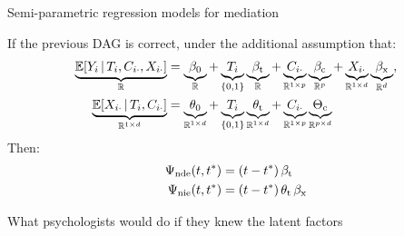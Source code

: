 \documentclass[aspectratio=169]{beamer}
\theoremstyle{remark}
\begin{document}
\begin{frame}{Semi-parametric regression models for mediation}

    If the previous DAG is correct, under the additional assumption that:
    \begin{equation*}
        \begin{aligned}
            \underbrace{\E[T_i, \C_{i \cdot}, \X_{i \cdot}]{Y_i}}_{\R}
             & = \underbrace{\betazero}_{\R}
            + \underbrace{T_i}_{\{0, 1\}} \underbrace{\betat}_{\R}
            + \underbrace{\C_{i \cdot}}_{\R^{1 \times p}} \underbrace{\betac}_{\R^{p}}
            + \underbrace{\X_{i \cdot}}_{\R^{1 \times d}} \underbrace{\betax}_{\R^d}, \\
            \underbrace{\E[T_i, \C_{i \cdot}]{\X_{i \cdot}}}_{\R^{1 \times d}}
             & = \underbrace{\thetazero}_{\R^{1 \times d}}
            + \underbrace{T_i}_{\{0, 1\}} \underbrace{\thetat}_{\R^{1 \times d}}
            + \underbrace{\C_{i \cdot}}_{\R^{1 \times p}} \underbrace{\Thetac}_{\R^{p \times d}}
        \end{aligned}
    \end{equation*}
    Then:
    \begin{align*}
        \ndef & = \paren*{t - t^*} \, \betat            \\
        \nief & = \paren*{t - t^*} \, \thetat \, \betax
    \end{align*}

\end{frame}


\begin{frame}{What psychologists would do if they knew the latent factors}


\end{frame}

\end{document}
